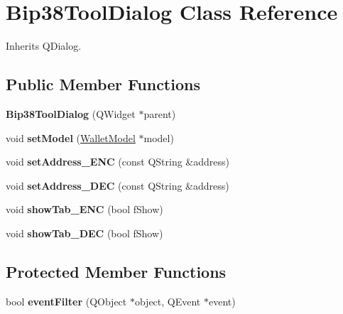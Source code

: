 \hypertarget{class_bip38_tool_dialog}{}\section{Bip38\+Tool\+Dialog Class Reference}
\label{class_bip38_tool_dialog}


Inherits Q\+Dialog.

\subsection*{Public Member Functions}
\begin{DoxyCompactItemize}
\item 
\mbox{\label{class_bip38_tool_dialog_ae253c496add5b5cc99bf9fec7b5dc654}} 
{\bfseries Bip38\+Tool\+Dialog} (Q\+Widget $\ast$parent)
\item 
\mbox{\label{class_bip38_tool_dialog_a2e37dfd7d0dc0dfdb57cf6b857180385}} 
void {\bfseries set\+Model} (\mbox{\hyperlink{class_wallet_model}{Wallet\+Model}} $\ast$model)
\item 
\mbox{\label{class_bip38_tool_dialog_ae361f2fb37a668ecf233f33947bacbe3}} 
void {\bfseries set\+Address\+\_\+\+E\+NC} (const Q\+String \&address)
\item 
\mbox{\label{class_bip38_tool_dialog_aff6cdfd8e8cb29bd72edd71156858049}} 
void {\bfseries set\+Address\+\_\+\+D\+EC} (const Q\+String \&address)
\item 
\mbox{\label{class_bip38_tool_dialog_afe430b8f9699b090e67d53a1ebf16471}} 
void {\bfseries show\+Tab\+\_\+\+E\+NC} (bool f\+Show)
\item 
\mbox{\label{class_bip38_tool_dialog_ab29765672d5abc354f355e77a82e7db3}} 
void {\bfseries show\+Tab\+\_\+\+D\+EC} (bool f\+Show)
\end{DoxyCompactItemize}
\subsection*{Protected Member Functions}
\begin{DoxyCompactItemize}
\item 
\mbox{\label{class_bip38_tool_dialog_a68cc2da759d7c60f471eb14cee8e31bf}} 
bool {\bfseries event\+Filter} (Q\+Object $\ast$object, Q\+Event $\ast$event)
\end{DoxyCompactItemize}


